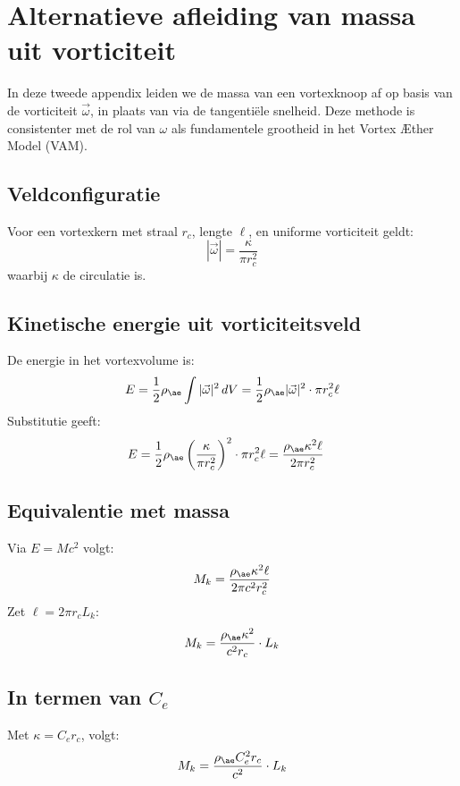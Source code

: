 \section{Alternatieve afleiding van massa uit vorticiteit}

In deze tweede appendix leiden we de massa van een vortexknoop af op basis van de vorticiteit \( \vec{\omega} \), in plaats van via de tangentiële snelheid. Deze methode is consistenter met de rol van \( \omega \) als fundamentele grootheid in het Vortex Æther Model (VAM).

\subsection{Veldconfiguratie}
Voor een vortexkern met straal \( r_c \), lengte \( \ell \), en uniforme vorticiteit geldt:
\begin{equation}
    |\vec{\omega}| = \frac{\kappa}{\pi r_c^2}
\end{equation}
waarbij \( \kappa \) de circulatie is.

\subsection{Kinetische energie uit vorticiteitsveld}
De energie in het vortexvolume is:
\begin{equation}
    E = \frac{1}{2} \rho_{\ae} \int |\vec{\omega}|^2 \, dV = \frac{1}{2} \rho_{\ae} |\vec{\omega}|^2 \cdot \pi r_c^2 \ell
\end{equation}
Substitutie geeft:
\begin{align}
    E &= \frac{1}{2} \rho_{\ae} \left( \frac{\kappa}{\pi r_c^2} \right)^2 \cdot \pi r_c^2 \ell = \frac{\rho_{\ae} \kappa^2 \ell}{2 \pi r_c^2}
\end{align}

\subsection{Equivalentie met massa}
Via \( E = M c^2 \) volgt:
\begin{equation}
    M_k = \frac{\rho_{\ae} \kappa^2 \ell}{2 \pi c^2 r_c^2}
\end{equation}
Zet \( \ell = 2 \pi r_c L_k \):
\begin{equation}
    M_k = \frac{\rho_{\ae} \kappa^2}{c^2 r_c} \cdot L_k
\end{equation}

\subsection{In termen van \( C_e \)}
Met \( \kappa = C_e r_c \), volgt:
\begin{equation}
    M_k = \frac{\rho_{\ae} C_e^2 r_c}{c^2} \cdot L_k
\end{equation}

